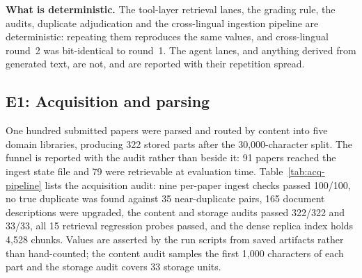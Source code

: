 \textbf{What is deterministic.} The tool-layer retrieval lanes, the grading rule, the audits, duplicate adjudication and the cross-lingual ingestion pipeline are deterministic: repeating them reproduces the same values, and cross-lingual round~2 was bit-identical to round~1. The agent lanes, and anything derived from generated text, are not, and are reported with their repetition spread.

\subsection{E1: Acquisition and parsing}
\label{sec:e1}

One hundred submitted papers were parsed and routed by content into five domain libraries, producing 322 stored parts after the 30{,}000-character split. The funnel is reported with the audit rather than beside it: 91 papers reached the ingest state file and 79 were retrievable at evaluation time. Table~\ref{tab:acq-pipeline} lists the acquisition audit: nine per-paper ingest checks passed 100/100, no true duplicate was found against 35 near-duplicate pairs, 165 document descriptions were upgraded, the content and storage audits passed 322/322 and 33/33, all 15 retrieval regression probes passed, and the dense replica index holds 4{,}528 chunks. Values are asserted by the run scripts from saved artifacts rather than hand-counted; the content audit samples the first 1{,}000 characters of each part and the storage audit covers 33 storage units.

